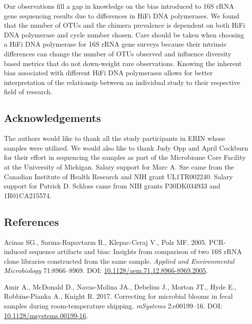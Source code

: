 \documentclass[12pt,]{article}
\begin{document}
Our observations fill a gap in knowledge on the bias introduced to 16S
rRNA gene sequencing results due to differences in HiFi DNA polymerases.
We found that the number of OTUs and the chimera prevalence is dependent
on both HiFi DNA polymerase and cycle number chosen. Care should be
taken when choosing a HiFi DNA polymerase for 16S rRNA gene surveys
because their intrinsic differences can change the number of OTUs
observed and influence diversity based metrics that do not down-weight
rare observations. Knowing the inherent bias associated with different
HiFi DNA polymerases allows for better interpretation of the relationsip
between an individual study to their respective field of research.

\newpage

\subsection{Acknowledgements}\label{acknowledgements}

The authors would like to thank all the study participants in ERIN whose
samples were utilized. We would also like to thank Judy Opp and April
Cockburn for their effort in sequencing the samples as part of the
Microbiome Core Facility at the University of Michigan. Salary support
for Marc A. Sze came from the Canadian Institute of Health Research and
NIH grant UL1TR002240. Salary support for Patrick D. Schloss came from
NIH grants P30DK034933 and 1R01CA215574.

\newpage

\subsection{References}\label{references}

\hypertarget{refs}{}
\hypertarget{ref-Acinas2005}{}
Acinas SG., Sarma-Rupavtarm R., Klepac-Ceraj V., Polz MF. 2005.
PCR-induced sequence artifacts and bias: Insights from comparison of two
16S rRNA clone libraries constructed from the same sample. \emph{Applied
and Environmental Microbiology} 71:8966--8969. DOI:
\href{https://doi.org/10.1128/aem.71.12.8966-8969.2005}{10.1128/aem.71.12.8966-8969.2005}.

\hypertarget{ref-Amir2017}{}
Amir A., McDonald D., Navas-Molina JA., Debelius J., Morton JT., Hyde
E., Robbins-Pianka A., Knight R. 2017. Correcting for microbial blooms
in fecal samples during room-temperature shipping. \emph{mSystems}
2:e00199--16. DOI:
\href{https://doi.org/10.1128/msystems.00199-16}{10.1128/msystems.00199-16}.
\end{document}
